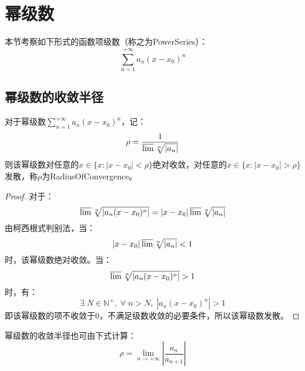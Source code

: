 \section{幂级数}
本节考察如下形式的函数项级数（称之为\gls{PowerSeries}）：
\begin{equation*}
	\sum_{n=1}^{+\infty}a_n(x-x_0)^n
\end{equation*}

\subsection{幂级数的收敛半径}
\begin{theorem}
	对于幂级数$\sum\limits_{n=1}^{+\infty}a_n(x-x_0)^n$，记：
	\begin{equation*}
		\rho=\frac{1}{\varlimsup\sqrt[n]{|a_n|}}
	\end{equation*}
	则该幂级数对任意的$x\in\{x:|x-x_0|<\rho\}$绝对收敛，对任意的$x\in\{x:|x-x_0|>\rho\}$发散，称$\rho$为\gls{RadiusOfConvergence}。
\end{theorem}
\begin{proof}
	对于：
	\begin{equation*}
		\varlimsup\sqrt[n]{|a_n(x-x_0)^n|}=|x-x_0|\varlimsup\sqrt[n]{|a_n|}
	\end{equation*}
	由柯西根式判别法，当：
	\begin{equation*}
		|x-x_0|\varlimsup\sqrt[n]{|a_n|}<1
	\end{equation*}
	时，该幂级数绝对收敛。当：
	\begin{equation*}
		\varlimsup\sqrt[n]{|a_n(x-x_0)^n|}>1
	\end{equation*}
	时，有：
	\begin{equation*}
		\exists\;N\in\mathbb{N}^+,\;\forall\;n>N,\;|a_n(x-x_0)^n|>1
	\end{equation*}
	即该幂级数的项不收敛于$0$，不满足级数收敛的必要条件，所以该幂级数发散。
\end{proof}
\begin{theorem}
	幂级数的收敛半径也可由下式计算：
	\begin{equation*}
		\rho=\lim_{n\to+\infty}\left|\frac{a_n}{a_{n+1}}\right|
	\end{equation*}
\end{theorem}
